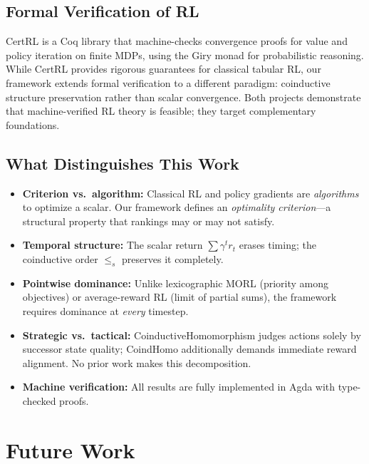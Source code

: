 \documentclass[9pt,a4paper]{article}
\theoremstyle{plain}
\theoremstyle{definition}
\theoremstyle{remark}
\begin{document}
\subsection{Formal Verification of RL}

CertRL \cite{Vajjha2021} is a Coq library that machine-checks convergence proofs for value and policy iteration on finite MDPs, using the Giry monad for probabilistic reasoning.  While CertRL provides rigorous guarantees for classical tabular RL, our framework extends formal verification to a different paradigm: coinductive structure preservation rather than scalar convergence.  Both projects demonstrate that machine-verified RL theory is feasible; they target complementary foundations.

\subsection{What Distinguishes This Work}

\begin{itemize}
\item \textbf{Criterion vs.\ algorithm:} Classical RL and policy gradients are \emph{algorithms} to optimize a scalar.  Our framework defines an \emph{optimality criterion}---a structural property that rankings may or may not satisfy.
\item \textbf{Temporal structure:} The scalar return $\sum \gamma^t r_t$ erases timing; the coinductive order $\le_s$ preserves it completely.
\item \textbf{Pointwise dominance:} Unlike lexicographic MORL (priority among objectives) or average-reward RL (limit of partial sums), the framework requires dominance at \emph{every} timestep.
\item \textbf{Strategic vs.\ tactical:} CoinductiveHomomorphism judges actions solely by successor state quality; CoindHomo additionally demands immediate reward alignment.  No prior work makes this decomposition.
\item \textbf{Machine verification:} All results are fully implemented in Agda with type-checked proofs.
\end{itemize}

\section{Future Work}
\end{document}
